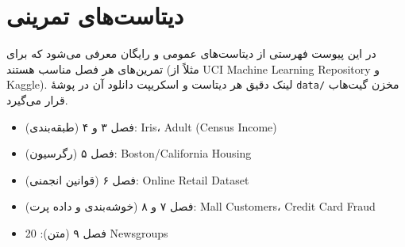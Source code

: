 \chapter{دیتاست‌های تمرینی}
\label{app:datasets}

در این پیوست فهرستی از دیتاست‌های عمومی و رایگان معرفی می‌شود که برای تمرین‌های هر فصل
مناسب هستند (مثلاً از UCI Machine Learning Repository و Kaggle). لینک دقیق هر دیتاست
و اسکریپت دانلود آن در پوشهٔ \texttt{data/} مخزن گیت‌هاب قرار می‌گیرد.

\begin{itemize}
    \item فصل ۳ و ۴ (طبقه‌بندی): Iris، Adult (Census Income)
    \item فصل ۵ (رگرسیون): Boston/California Housing
    \item فصل ۶ (قوانین انجمنی): Online Retail Dataset
    \item فصل ۷ و ۸ (خوشه‌بندی و داده پرت): Mall Customers، Credit Card Fraud
    \item فصل ۹ (متن): 20 Newsgroups
\end{itemize}
